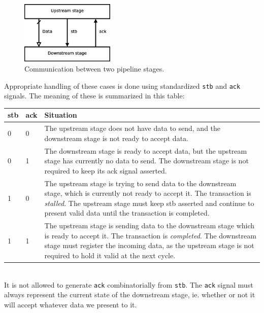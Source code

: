 \documentclass[a4paper,11pt]{article}
\begin{document}
\begin{figure}[H]
\centering
\includegraphics[height=30mm]{comm.eps}
\caption{Communication between two pipeline stages.}\label{fig:comm}
\end{figure}

Appropriate handling of these cases is done using standardized \verb!stb! and \verb!ack! signals. The meaning of these is summarized in this table:\\

\begin{tabularx}{\textwidth}{|l|l|X|}
\hline
\bf stb & \bf ack & \bf Situation \\
\hline
0 & 0 & The upstream stage does not have data to send, and the downstream stage is not ready to accept data. \\
\hline
0 & 1 & The downstream stage is ready to accept data, but the upstream stage has currently no data to send. The downstream stage is not required to keep its ack signal asserted. \\
\hline
1 & 0 & The upstream stage is trying to send data to the downstream stage, which is currently not ready to accept it. The transaction is \textit{stalled}. The upstream stage must keep stb asserted and continue to present valid data until the transaction is completed. \\
\hline
1 & 1 & The upstream stage is sending data to the downstream stage which is ready to accept it. The transaction is \textit{completed}. The downstream stage must register the incoming data, as the upstream stage is not required to hold it valid at the next cycle. \\
\hline
\end{tabularx}\\

It is not allowed to generate \verb!ack! combinatorially from \verb!stb!. The \verb!ack! signal must always represent the current state of the downstream stage, ie. whether or not it will accept whatever data we present to it.
\end{document}
